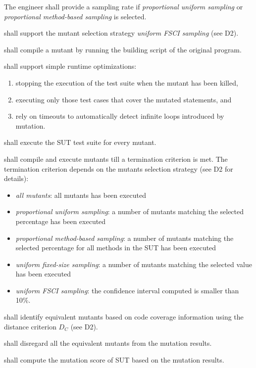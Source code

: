 \RQ{} The engineer shall provide a sampling rate if \textit{proportional uniform sampling} or \textit{proportional method-based sampling} is selected.

\RQ{} \FAQAS shall support the mutant selection strategy \textit{uniform FSCI sampling} (see D2).

\RQ{} \FAQAS shall compile a mutant by running the building script of the original program.

\RQ{} \FAQAS shall support simple runtime optimizations:
\begin{enumerate}
	\item stopping the execution of the test suite when the mutant has been killed,
	\item executing only those test cases that cover the mutated statements, and 
	\item rely on timeouts to automatically detect infinite loops introduced by mutation.
\end{enumerate}

\RQ{} \FAQAS shall execute the SUT test suite for every mutant.

\RQ{} \FAQAS shall compile and execute mutants till a termination criterion is met. The termination criterion depends on the mutants selection strategy (see D2 for details):
\begin{itemize}
	\item \emph{all mutants}: all mutants has been executed
	\item \emph{proportional uniform sampling}: a number of mutants matching the selected percentage has been executed
	\item \emph{proportional method-based sampling}: a number of mutants matching the selected percentage for all methods in the SUT has been executed
	\item \emph{uniform fixed-size sampling}: a number of mutants matching the selected value has been executed
	\item \emph{uniform FSCI sampling}: the confidence interval computed is smaller than 10\%.
\end{itemize}

\RQ{} \FAQAS shall identify equivalent mutants based on code coverage information using the distance criterion $D_C$ (see D2).

\RQ{} \FAQAS shall disregard all the equivalent mutants from the mutation results.

\RQ{} \FAQAS shall compute the mutation score of SUT based on the mutation results.

